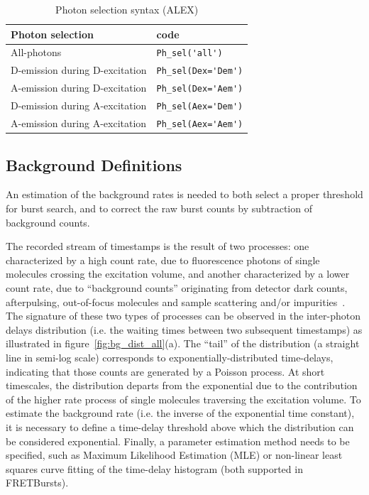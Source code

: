 \documentclass[10pt,letterpaper]{article}
\begin{document}
\begin{table}
\begin{tabular}{l|l}
  Photon selection  & code \\
  \hline
  All-photons & \verb|Ph_sel('all')|\\
  D-emission during D-excitation & \verb|Ph_sel(Dex='Dem')|\\
  A-emission during D-excitation & \verb|Ph_sel(Dex='Aem')|\\
  D-emission during A-excitation & \verb|Ph_sel(Aex='Dem')|\\
  A-emission during A-excitation & \verb|Ph_sel(Aex='Aem')|\\
\end{tabular}
\caption{\label{tab:ph_sel_alex}Photon selection syntax (ALEX)}
\end{table}

\subsection*{Background Definitions}
\label{sec:bg_intro}

An estimation of the background rates is needed to both select a proper threshold for
burst search, and to correct the raw burst counts by subtraction of background counts.

The recorded stream of timestamps is the result of two processes: one characterized
by a high count rate, due to fluorescence photons of single molecules crossing the
excitation volume, and another characterized by a lower count rate, due to ``background
counts'' originating from detector dark counts, afterpulsing, out-of-focus molecules
and sample scattering and/or impurities~\cite{Edman_1996,Gopich_2008}.
The signature of these two types of processes can be
observed in the inter-photon delays distribution (i.e. the waiting times
between two subsequent timestamps) as illustrated in figure~\ref{fig:bg_dist_all}(a).
The ``tail'' of the distribution (a straight line in semi-log scale) corresponds
to exponentially-distributed time-delays, indicating that those counts are generated by a
Poisson process. At short
timescales, the distribution departs from the exponential due to the contribution
of the higher rate process of single molecules traversing the excitation volume.
To estimate the background rate (i.e. the inverse of the exponential time constant),
it is necessary to define a time-delay threshold above which the distribution
can be considered exponential.
Finally, a parameter estimation method needs to be specified, such as Maximum
Likelihood Estimation (MLE) or non-linear least squares curve fitting of
the time-delay histogram (both supported in FRETBursts).
\end{document}
